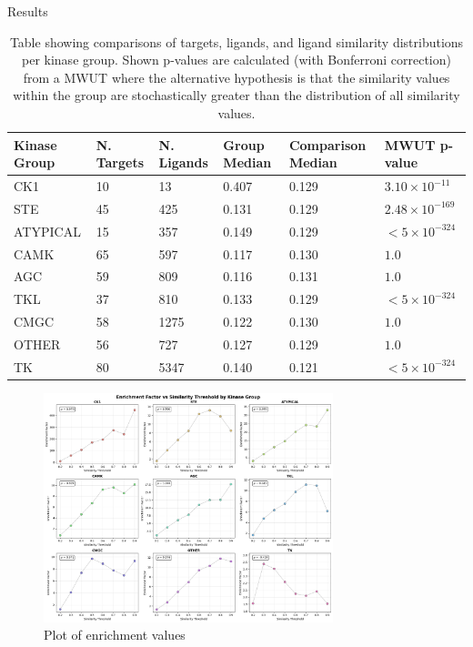 \documentclass[final]{beamer}
\newlength{\colwidth}
\begin{document}
\begin{frame}[t]
\begin{columns}[t]
\begin{column}{\colwidth}
\begin{block}{Results}
    \begin{table}[!ht]
    \centering
    \small
    \begin{tabular}{l|l|l|l|l|l}
        \hline
        \textbf{Kinase Group} & \textbf{N. Targets} & \textbf{N. Ligands} & \textbf{Group Median} &\textbf{Comparison Median} & \textbf{MWUT p-value} \\ \hline
        CK1 & 10 & 13 & 0.407 & 0.129 & $3.10 \times 10^{-11}$ \\ \hline
        STE & 45 & 425 & 0.131 & 0.129 & $2.48 \times 10^{-169}$ \\ \hline
        ATYPICAL & 15 & 357 & 0.149 & 0.129 & $< 5 \times 10^{-324}$ \\ \hline
        CAMK & 65 & 597 & 0.117 & 0.130 & $1.0$ \\ \hline
        AGC & 59 & 809 & 0.116 & 0.131 & $1.0$ \\ \hline
        TKL & 37 & 810 & 0.133 & 0.129 & $< 5 \times 10^{-324}$ \\ \hline
        CMGC & 58 & 1275 & 0.122 & 0.130 & $1.0$ \\ \hline
        OTHER & 56 & 727 & 0.127 & 0.129 & $1.0$ \\ \hline
        TK & 80 & 5347 & 0.140 & 0.121 & $< 5 \times 10^{-324}$ \\ \hline
    \end{tabular}
    \caption{Table showing comparisons of targets, ligands, and ligand similarity distributions per kinase group. Shown p-values are calculated (with Bonferroni correction) from a MWUT where the alternative hypothesis is that the similarity values within the group are stochastically greater than the distribution of all similarity values.}\label{results_table}
    \end{table}

    \begin{figure}
        \centering
        \includegraphics[width=0.75\textwidth]{../figures/enrichment_factor_by_group.png}
        \caption{Plot of enrichment values}
        \label{enrichment_plot}
    \end{figure}


\end{block}
\end{column}
\end{columns}
\end{frame}
\end{document}
